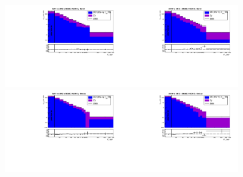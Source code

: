 \begin{figure}[htb]
  \begin{center}
   \includegraphics[width=0.45\textwidth]{../figs/figs_v11/MUON_ZGamma/PrepareYields/c_DATAvsBkgPlusSigMCc_MUON_ZGamma_TEMPL_CHISO_UNblind__Barrel__phoEt.pdf}\includegraphics[width=0.45\textwidth]{../figs/figs_v11/MUON_ZGamma/PrepareYields/c_DATAvsBkgPlusSigMCc_MUON_ZGamma_TEMPL_SIHIH_UNblind__Barrel__phoEt.pdf}  \\
   \includegraphics[width=0.45\textwidth]{../figs/figs_v11/MUON_ZGamma/PrepareYields/c_DATAvsBkgPlusSigMCc_MUON_ZGamma_TEMPL_CHISO_UNblind__Endcap__phoEt.pdf}\includegraphics[width=0.45\textwidth]{../figs/figs_v11/MUON_ZGamma/PrepareYields/c_DATAvsBkgPlusSigMCc_MUON_ZGamma_TEMPL_SIHIH_UNblind__Endcap__phoEt.pdf}  \\

\end{center}
\end{figure}

